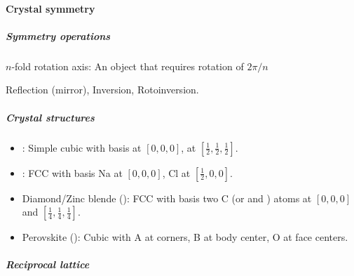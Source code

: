 \paragraph{Crystal symmetry}

\subparagraph{Symmetry operations}

\begin{enumext}
  \item $n$-fold rotation axis: An object that requires rotation of $2\pi/n$
  \item Reflection (mirror), Inversion, Rotoinversion.
\end{enumext}

\subparagraph{Crystal structures}

\begin{itemize}
  \item {}: Simple cubic with basis  at $[0,0,0]$,
   at $[\frac12,\frac12,\frac12]$.
  \item {}: FCC with basis Na at $[0,0,0]$, Cl at $[\frac12,0,0]$.
  \item Diamond/Zinc blende (): FCC with basis two \ce C
  (or  and ) atoms at $[0,0,0]$ and $[\frac14,\frac14,\frac14]$.
  \item Perovskite (): Cubic with \ce A at corners, \ce B at body
  center, \ce O at face centers.
\end{itemize}

\subparagraph{Reciprocal lattice}


